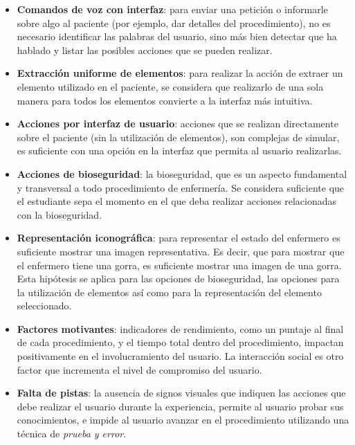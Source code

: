 \begin{itemize}
\item 
    \textbf{Comandos de voz con interfaz}:  para enviar una petición o informarle 
    sobre algo al paciente (por ejemplo, dar detalles del procedimiento), 
    no es necesario identificar las palabras del usuario, sino más bien detectar
    que ha hablado y listar las posibles acciones que se pueden realizar.
    
\item \textbf{Extracción uniforme de elementos}: para realizar la acción de
    extraer un elemento utilizado en el paciente, se considera que realizarlo de
    una sola manera para todos los elementos convierte a la interfaz más
    intuitiva.

\item \textbf{Acciones por interfaz de usuario}: acciones que se realizan
    directamente sobre el paciente (sin la utilización de elementos), son
    complejas de simular, es suficiente con una opción en la interfaz que
    permita al usuario realizarlas. 
    
\item \textbf{Acciones de bioseguridad}: la bioseguridad, que es un aspecto
    fundamental y transversal a todo procedimiento de enfermería. Se considera
    suficiente que el estudiante sepa el momento en el que deba realizar
    acciones relacionadas con la bioseguridad.
    
\item \textbf{Representación iconográfica}: para representar el estado del
    enfermero es suficiente mostrar una imagen representativa. Es decir, que
    para mostrar que el enfermero tiene una gorra, es suficiente mostrar una
    imagen de una gorra. Esta hipótesis se aplica para las opciones de
    bioseguridad, las opciones para la utilización de elementos así como para la
    representación del elemento seleccionado.

\item \textbf{Factores motivantes}: indicadores de rendimiento, como un puntaje
    al final de cada procedimiento, y el tiempo total dentro del procedimiento,
    impactan positivamente en el involucramiento del usuario. La interacción
    social es otro factor que incrementa el nivel de compromiso del usuario.

\item \textbf{Falta de pistas}: la ausencia de signos visuales que indiquen las
    acciones que debe realizar el usuario durante la experiencia, permite al
    usuario probar sus conocimientos, e impide al usuario avanzar en el
    procedimiento utilizando una técnica de \emph{prueba y error}.

\end{itemize}

